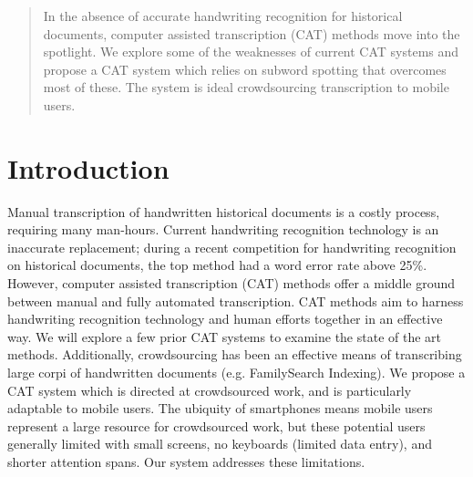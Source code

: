 \documentclass[conference]{IEEEtran}
\begin{document}




\maketitle

\begin{abstract}
In the absence of accurate handwriting recognition for historical documents, computer assisted transcription (CAT) methods move into the spotlight. We explore some of the weaknesses of current CAT systems and propose a CAT system which relies on subword spotting that overcomes most of these. The system is ideal crowdsourcing transcription to mobile users.
\end{abstract}





%
\IEEEpeerreviewmaketitle



\section{Introduction} %
Manual transcription of handwritten historical documents is a costly process, requiring many man-hours. Current handwriting recognition technology is an inaccurate replacement; during a recent competition for handwriting recognition on historical documents, the top method had a word error rate above 25\%\cite{icdarComp2015}.  However, computer assisted transcription (CAT) methods offer a middle ground between manual and fully automated transcription. CAT methods aim to harness handwriting recognition technology and human efforts together in an effective way. We will explore a few prior CAT systems to examine the state of the art methods. Additionally, crowdsourcing has been an effective means of transcribing large corpi of handwritten documents (e.g. FamilySearch Indexing). We propose a CAT system which is directed at crowdsourced work, and is particularly adaptable to mobile users. The ubiquity of smartphones means mobile users represent a large resource for crowdsourced work, but these potential users generally limited with small screens, no keyboards (limited data entry), and shorter attention spans. Our system addresses these limitations.
\end{document}
